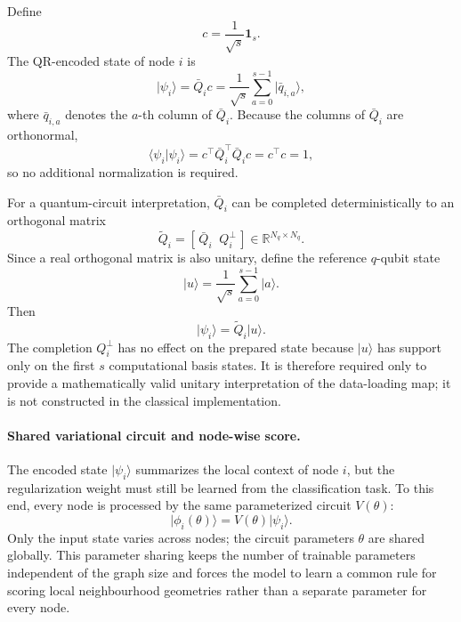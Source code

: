 \documentclass[11pt,a4paper]{article}
\begin{document}
Define
\[
c
=
\frac{1}{\sqrt{s}}\mathbf{1}_s.
\]
The QR-encoded state of node \(i\) is
\begin{equation}
\lvert\psi_i\rangle
=
\bar Q_i c
=
\frac{1}{\sqrt{s}}
\sum_{a=0}^{s-1}
\lvert\bar q_{i,a}\rangle,
\label{eq:qr_encoded_state}
\end{equation}
where \(\bar q_{i,a}\) denotes the \(a\)-th column of \(\bar Q_i\).
Because the columns of \(\bar Q_i\) are orthonormal,
\[
\langle\psi_i\vert\psi_i\rangle
=
c^\top \bar Q_i^\top\bar Q_i c
=
c^\top c
=
1,
\]
so no additional normalization is required.

For a quantum-circuit interpretation, \(\bar Q_i\) can be completed
deterministically to an orthogonal matrix
\[
\widetilde Q_i
=
[\,\bar Q_i\;\;Q_i^\perp\,]
\in
\mathbb{R}^{N_q\times N_q}.
\]
Since a real orthogonal matrix is also unitary, define the reference
\(q\)-qubit state
\begin{equation}
\lvert u\rangle
=
\frac{1}{\sqrt{s}}
\sum_{a=0}^{s-1}\lvert a\rangle .
\label{eq:reference_qr_state}
\end{equation}
Then
\[
\lvert\psi_i\rangle
=
\widetilde Q_i\lvert u\rangle.
\]
The completion \(Q_i^\perp\) has no effect on the prepared state because
\(\lvert u\rangle\) has support only on the first \(s\) computational basis
states. It is therefore required only to provide a mathematically valid
unitary interpretation of the data-loading map; it is not constructed in the
classical implementation.

\paragraph{Shared variational circuit and node-wise score.}

The encoded state \(\lvert\psi_i\rangle\) summarizes the local context of node
\(i\), but the regularization weight must still be learned from the
classification task. To this end, every node is processed by the same
parameterized circuit \(V(\theta)\):
\begin{equation}
\lvert\phi_i(\theta)\rangle
=
V(\theta)\lvert\psi_i\rangle.
\label{eq:variational_state}
\end{equation}
Only the input state varies across nodes; the circuit parameters
\(\theta\) are shared globally. This parameter sharing keeps the number of
trainable parameters independent of the graph size and forces the model to
learn a common rule for scoring local neighbourhood geometries rather than a
separate parameter for every node.
\end{document}

